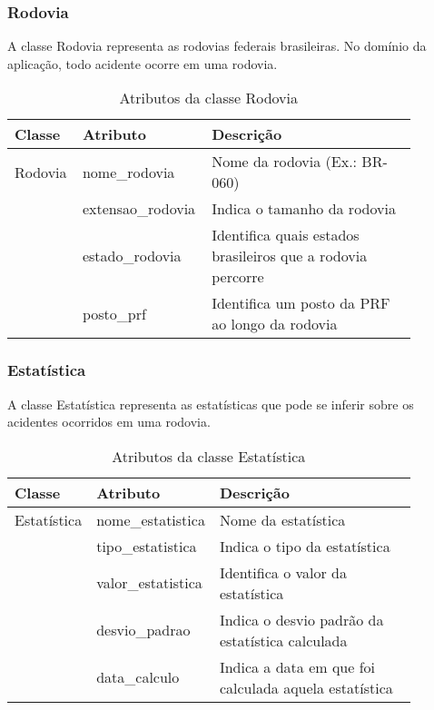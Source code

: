     
\subsubsection{\textbf{Rodovia}}

  A classe Rodovia representa as rodovias federais brasileiras. No domínio da aplicação, todo acidente ocorre em uma rodovia.
  
    \begin{table*}[!h]
    \centering
    \begin{tabular}{p{0.15\linewidth}p{0.23\linewidth}p{0.5\linewidth}}
      \hline
      \textbf{Classe} & \textbf{Atributo} & \textbf{Descrição}\\
      \hline
	Rodovia & nome\_rodovia & Nome da rodovia (Ex.: BR-060)\\
		& extensao\_rodovia & Indica o tamanho da rodovia\\
		& estado\_rodovia & Identifica quais estados brasileiros que a rodovia percorre\\
		& posto\_prf & Identifica um posto da PRF ao longo da rodovia\\
      \hline
    \end{tabular}
    \caption{Atributos da classe Rodovia}
    \label{tab:attr_rodovia}
    \end{table*}

\subsubsection{\textbf{Estatística}}

  A classe Estatística representa as estatísticas que pode se inferir sobre os acidentes ocorridos em uma rodovia.
  
    \begin{table*}[!h]
    \centering
    \begin{tabular}{p{0.15\linewidth}p{0.23\linewidth}p{0.5\linewidth}}
      \hline
      \textbf{Classe} & \textbf{Atributo} & \textbf{Descrição}\\
      \hline
	Estatística & nome\_estatistica & Nome da estatística\\
		    & tipo\_estatistica & Indica o tipo da estatística\\
		    & valor\_estatistica & Identifica o valor da estatística\\
		    & desvio\_padrao & Indica o desvio padrão da estatística calculada\\
		    & data\_calculo & Indica a data em que foi calculada aquela estatística\\
      \hline
    \end{tabular}
    \caption{Atributos da classe Estatística}
    \label{tab:attr_estatistica}
    \end{table*}    


